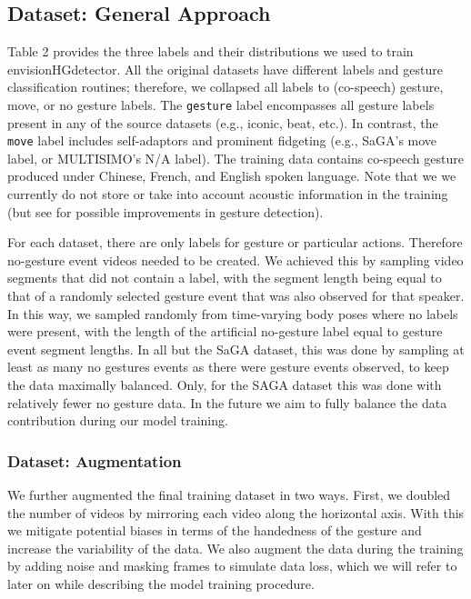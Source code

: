 \documentclass[11pt,headings=small,cleardoublepage=empty,tocflat,numbers=noenddot,twoside,captions=tableheading]{scrbook}
\begin{document}
\begin{refsection}
\subsection{Dataset: General Approach}
Table 2 provides the three labels and their distributions we used to train envisionHGdetector. All the original datasets have different labels and gesture classification routines; therefore, we collapsed all labels to (co-speech) gesture, move, or no gesture labels. The \texttt{gesture}
label encompasses all gesture labels present in any of the source datasets (e.g., iconic, beat, etc.). In contrast, the \texttt{move} label includes self-adaptors and prominent fidgeting (e.g., SaGA's move label, or MULTISIMO's N/A label). The training data contains co-speech gesture produced under Chinese, French, and English spoken language. Note that we we currently do not store or take into account acoustic information in the training (but see \parencite{ghalebLeveragingSpeechGesture2024} for possible improvements in gesture detection).

For each dataset, there are only labels for gesture or particular actions. Therefore no-gesture event videos needed to be created. We achieved this by sampling video segments that did not contain a label, with the segment length being equal to that of a randomly selected gesture event that was also observed for that speaker. In this way, we sampled randomly from time-varying body poses where no labels were present, with the length of the artificial no-gesture label equal to gesture event segment lengths. In all but the SaGA dataset, this was done by sampling at least as many no gestures events as there were gesture events observed, to keep the data maximally balanced. Only, for the SAGA dataset this was done with relatively fewer no gesture data. In the future we aim to fully balance the data contribution during our model training.

\subsubsection{Dataset: Augmentation}
We further augmented the final training dataset in two ways. First, we doubled the number of videos by mirroring each video along the horizontal axis. With this we mitigate potential biases in terms of the handedness of the gesture and increase the variability of the data. We also augment the data during the training by adding noise and masking frames to simulate data loss, which we will refer to later on while describing the model training procedure.


\end{refsection}
\end{document}
